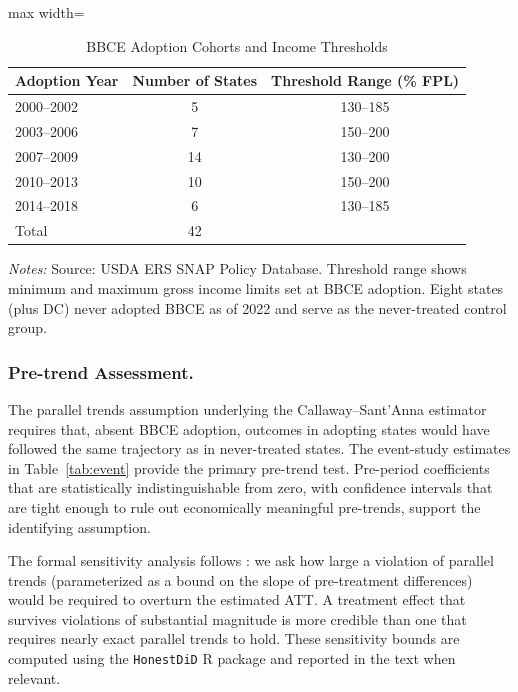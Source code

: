 \documentclass[12pt]{article}
\begin{document}
\begin{table}[H]
\centering
\caption{BBCE Adoption Cohorts and Income Thresholds}
\label{tab:adoption_cohorts}
\begin{adjustbox}{max width=\textwidth}
\begin{threeparttable}
\begin{tabular}{lcc}
\toprule
Adoption Year & Number of States & Threshold Range (\% FPL) \\
\midrule
2000--2002 & 5  & 130--185 \\
2003--2006 & 7  & 150--200 \\
2007--2009 & 14 & 130--200 \\
2010--2013 & 10 & 150--200 \\
2014--2018 & 6  & 130--185 \\
\midrule
Total & 42 & \\
\bottomrule
\end{tabular}
\begin{tablenotes}
\footnotesize
\item \textit{Notes:} Source: USDA ERS SNAP Policy Database. Threshold range shows minimum and maximum gross income limits set at BBCE adoption. Eight states (plus DC) never adopted BBCE as of 2022 and serve as the never-treated control group.
\end{tablenotes}
\end{threeparttable}
\end{adjustbox}
\end{table}

\subsubsection*{Pre-trend Assessment.} The parallel trends assumption underlying the Callaway--Sant'Anna estimator requires that, absent BBCE adoption, outcomes in adopting states would have followed the same trajectory as in never-treated states. The event-study estimates in Table~\ref{tab:event} provide the primary pre-trend test. Pre-period coefficients that are statistically indistinguishable from zero, with confidence intervals that are tight enough to rule out economically meaningful pre-trends, support the identifying assumption.

The formal sensitivity analysis follows \citet{rambachan2023more}: we ask how large a violation of parallel trends (parameterized as a bound on the slope of pre-treatment differences) would be required to overturn the estimated ATT. A treatment effect that survives violations of substantial magnitude is more credible than one that requires nearly exact parallel trends to hold. These sensitivity bounds are computed using the \texttt{HonestDiD} R package and reported in the text when relevant.
\end{document}
